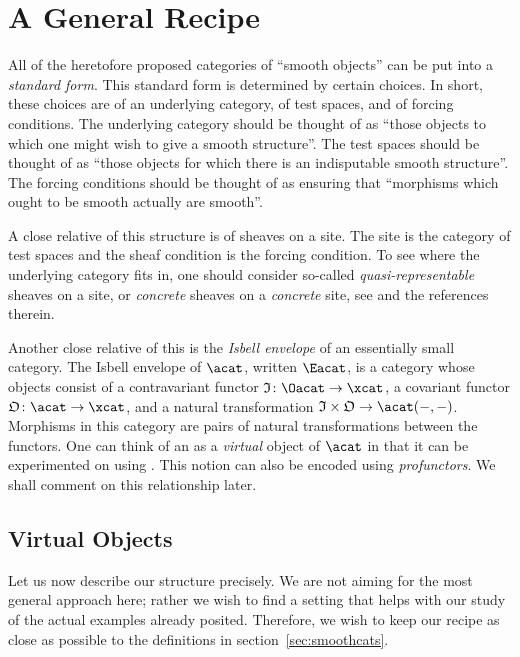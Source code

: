 \documentclass[%
12pt,%
arxiv,%
defaults
]{myclass}
\begin{document}
\section{A General Recipe}
\label{sec:recipe}

All of the heretofore proposed categories of ``smooth objects'' can be put into a \emph{standard form}.
This standard form is determined by certain choices.
In short, these choices are of an underlying category, of test spaces, and of forcing conditions.
The underlying category should be thought of as ``those objects to which one might wish to give a smooth structure''.
The test spaces should be thought of as ``those objects for which there is an indisputable smooth structure''.
The forcing conditions should be thought of as ensuring that ``morphisms which ought to be smooth actually are smooth''.

A close relative of this structure is of sheaves on a site.
The site is the category of test spaces and the sheaf condition is the forcing condition.
To see where the underlying category fits in, one should consider so\hyp{}called \emph{quasi\hyp{}representable} sheaves on a site, or \emph{concrete} sheaves on a \emph{concrete} site, see \cite{0807.1704} and the references therein.

Another close relative of this is the \emph{Isbell envelope} of an essentially small category.
The Isbell envelope of \(\acat\), written \(\Eacat\), is a category whose objects consist of a contravariant functor \(\itest \colon \Oacat \to \xcat\), a covariant functor \(\otest \colon \acat \to \xcat\), and a natural transformation \(\itest \times \otest \to \Hom{\acat}{-}{-}\).
Morphisms in this category are pairs of natural transformations between the functors.
One can think of an \Eaobj as a \emph{virtual} object of \(\acat\) in that it can be experimented on using \aobjs.
This notion can also be encoded using \emph{profunctors}.
We shall comment on this relationship later.


\subsection{Virtual Objects}

Let us now describe our structure precisely.
We are not aiming for the most general approach here; rather we wish to find a setting that helps with our study of the actual examples already posited.
Therefore, we wish to keep our recipe as close as possible to the definitions in section~\ref{sec:smoothcats}.
\end{document}
